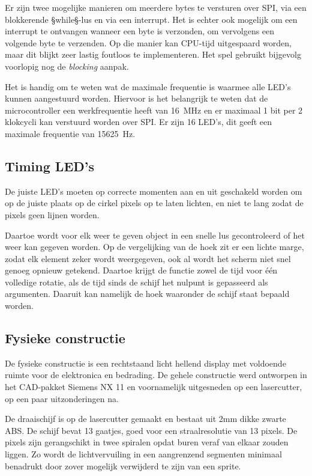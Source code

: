\documentclass[12pt]{ugentreport}
\begin{document}
Er zijn twee mogelijke manieren om meerdere bytes te versturen over SPI,
via een blokkerende §while§-lus en via een interrupt.
Het is echter ook mogelijk om een interrupt te ontvangen wanneer een byte is
verzonden,
om vervolgens een volgende byte te verzenden. Op die manier kan CPU-tijd
uitgespaard worden, maar dit blijkt zeer lastig foutloos te implementeren.
Het spel gebruikt bijgevolg voorlopig nog de \emph{blocking} aanpak.

Het is handig om te weten wat de maximale frequentie is waarmee alle LED's
kunnen aangestuurd worden.
Hiervoor is het belangrijk te weten dat de microcontroller
een werkfrequentie heeft van \SI{16}{\mega\hertz}
en er maximaal 1 bit per 2 klokcycli kan verstuurd worden over SPI.
Er zijn 16 LED's, dit geeft een maximale frequentie van \SI{15625}{\hertz}.

\subsection{Timing LED's}
\label{sec:ledtiming}
De juiste LED's moeten op correcte momenten aan en uit geschakeld worden
om op de juiste plaats op de cirkel pixels op te laten lichten,
en niet te lang zodat de pixels geen lijnen worden.

Daartoe wordt voor elk weer te geven object in een snelle lus gecontroleerd of het
weer kan gegeven worden. Op de vergelijking van de hoek zit er een lichte marge,
zodat elk element zeker wordt weergegeven, ook al wordt het scherm niet snel
genoeg opnieuw getekend. Daartoe krijgt de functie zowel de tijd voor één volledige rotatie,
als de tijd sinds de schijf het nulpunt is gepasseerd als argumenten.
Daaruit kan namelijk de hoek waaronder de schijf staat bepaald worden.

\subsection{Fysieke constructie}

De fysieke constructie is een rechtstaand licht hellend display met voldoende
ruimte voor de elektronica en bedrading. De gehele constructie werd ontworpen
in het CAD-pakket Siemens NX 11 en voornamelijk uitgesneden op een lasercutter,
op een paar uitzonderingen na.

De draaischijf is op de lasercutter gemaakt en bestaat uit 2mm dikke zwarte ABS.
De schijf bevat 13 gaatjes, goed voor een straalresolutie van 13 pixels. De pixels
zijn gerangschikt in twee spiralen opdat buren veraf van elkaar zouden liggen. Zo
wordt de lichtvervuiling in een aangrenzend segmenten minimaal benadrukt door
zover mogelijk verwijderd te zijn van een sprite.
\end{document}
